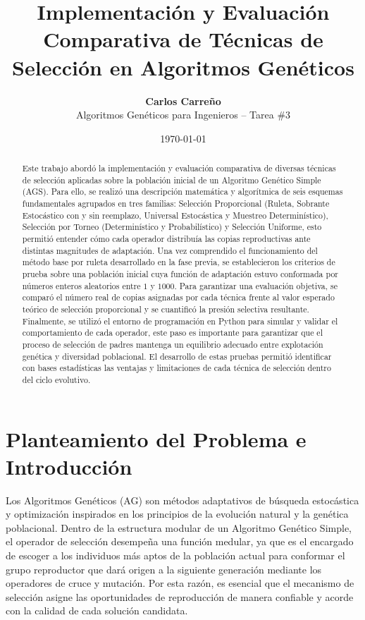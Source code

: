 \documentclass[11pt,letterpaper]{article}
\title{\textbf{Implementación y Evaluación Comparativa de Técnicas de Selección en Algoritmos Genéticos}}
\author{\textbf{Carlos Carreño} \\ Algoritmos Genéticos para Ingenieros -- Tarea \#3}
\date{\today}
\begin{document}
\maketitle

\begin{abstract}
\noindent Este trabajo abordó la implementación y evaluación comparativa de diversas técnicas de selección aplicadas sobre la población inicial de un Algoritmo Genético Simple (AGS). Para ello, se realizó una descripción matemática y algorítmica de seis esquemas fundamentales agrupados en tres familias: Selección Proporcional (Ruleta, Sobrante Estocástico con y sin reemplazo, Universal Estocástica y Muestreo Determinístico), Selección por Torneo (Determinístico y Probabilístico) y Selección Uniforme, esto permitió entender cómo cada operador distribuía las copias reproductivas ante distintas magnitudes de adaptación. Una vez comprendido el funcionamiento del método base por ruleta desarrollado en la fase previa, se establecieron los criterios de prueba sobre una población inicial cuya función de adaptación estuvo conformada por números enteros aleatorios entre $1$ y $1000$. Para garantizar una evaluación objetiva, se comparó el número real de copias asignadas por cada técnica frente al valor esperado teórico de selección proporcional y se cuantificó la presión selectiva resultante. Finalmente, se utilizó el entorno de programación en Python para simular y validar el comportamiento de cada operador, este paso es importante para garantizar que el proceso de selección de padres mantenga un equilibrio adecuado entre explotación genética y diversidad poblacional. El desarrollo de estas pruebas permitió identificar con bases estadísticas las ventajas y limitaciones de cada técnica de selección dentro del ciclo evolutivo.
\end{abstract}

\section{Planteamiento del Problema e Introducción}
Los Algoritmos Genéticos (AG) son métodos adaptativos de búsqueda estocástica y optimización inspirados en los principios de la evolución natural y la genética poblacional. Dentro de la estructura modular de un Algoritmo Genético Simple, el operador de selección desempeña una función medular, ya que es el encargado de escoger a los individuos más aptos de la población actual para conformar el grupo reproductor que dará origen a la siguiente generación mediante los operadores de cruce y mutación. Por esta razón, es esencial que el mecanismo de selección asigne las oportunidades de reproducción de manera confiable y acorde con la calidad de cada solución candidata.
\end{document}
